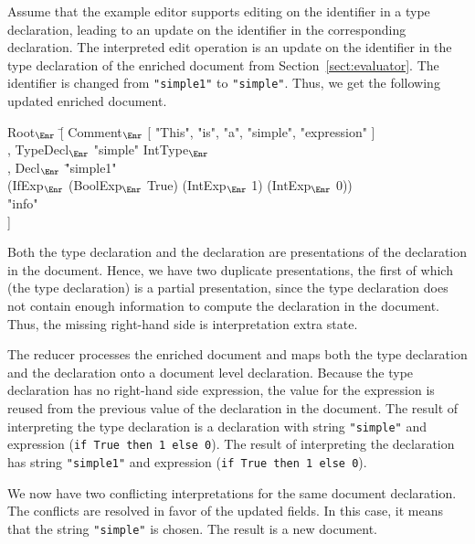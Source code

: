 Assume that the example editor supports editing on the identifier in a type declaration, leading to an update on the identifier in the corresponding declaration. 
The interpreted edit operation is an update on the identifier in the type declaration of the enriched document from Section~\ref{sect:evaluator}. The identifier is changed from \verb|"simple1"| to \verb|"simple"|. Thus, we get the following updated enriched document.

\small \ttfamily
\begin{tabbing}
Root$_{\Enr}$ \= [ Comment$_{\Enr}$ [ "This", "is", "a", "simple", "expression" ]\\
       \> , TypeDecl$_{\Enr}$ "simple" IntType$_{\Enr}$\\
       \> , Decl$_{\Enr}$ \= "simple1"\\
       \>                       \> (IfExp$_{\Enr}$ (BoolExp$_{\Enr}$ True) (IntExp$_{\Enr}$ 1) (IntExp$_{\Enr}$ 0)) \\
       \>                       \> "info"\\
       \> ] 
\end{tabbing}
\rmfamily \normalsize

Both the type declaration and the declaration are presentations of the declaration in the document. Hence, we have two duplicate presentations, the first of which (the type declaration) is a partial presentation, since the type declaration does not contain enough information to compute the declaration in the document. Thus, the missing right-hand side is interpretation extra state.

The reducer processes the enriched document and maps both the type declaration and the declaration onto a document level declaration. Because the type declaration has no right-hand side expression, the value for the expression is reused from the previous value of the declaration in the document. The result of interpreting the type declaration is a declaration with string 
\verb|"simple"| and expression (\verb|if True then 1 else 0|). The result of interpreting the declaration has string \verb|"simple1"| and expression (\verb|if True then 1 else 0|).

We now have two conflicting interpretations for the same document declaration. The conflicts are resolved in favor of the updated fields. In this case, it means that the string \verb|"simple"| is chosen. The result is a new document.

